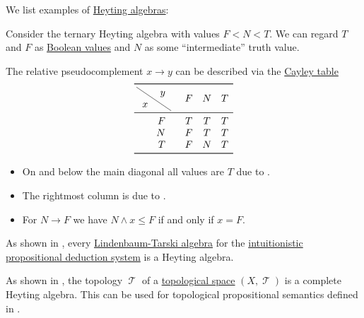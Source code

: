 \begin{example}\label{ex:def:heyting_algebra}
  We list examples of \hyperref[def:heyting_algebra]{Heyting algebras}:
  \begin{thmenum}
     Consider the ternary Heyting algebra with values \( F < N < T \). We can regard \( T \) and \( F \) as \hyperref[con:boolean_value]{Boolean values} and \( N \) as some \enquote{intermediate} truth value.

    The relative pseudocomplement \( x \rightarrow y \) can be described via the \hyperref[def:cayley_table]{Cayley table}
    \begin{equation*}
      \begin{array}{r !{\quad} *{3}{c}}
        \toprule
        \mdiagbox{x}{y} & F & N & T \\
        \midrule
        F               & T & T & T \\
        N               & F & T & T \\
        T               & F & N & T \\
        \bottomrule
      \end{array}
    \end{equation*}

    \begin{itemize}
      \item On and below the main diagonal all values are \( T \) due to .
      \item The rightmost column is due to .
      \item For \( N \rightarrow F \) we have \( N \wedge x \leq F \) if and only if \( x = F \).
    \end{itemize}

     As shown in , every \hyperref[def:lindenbaum_tarski_algebra]{Lindenbaum-Tarski algebra} for the \hyperref[def:propositional_natural_deduction_systems]{intuitionistic propositional deduction system} is a Heyting algebra.

     As shown in , the topology \( \mscrT \) of a \hyperref[def:topological_space]{topological space} \( (X, \mscrT) \) is a complete Heyting algebra. This can be used for topological propositional semantics defined in .
  \end{thmenum}
\end{example}

